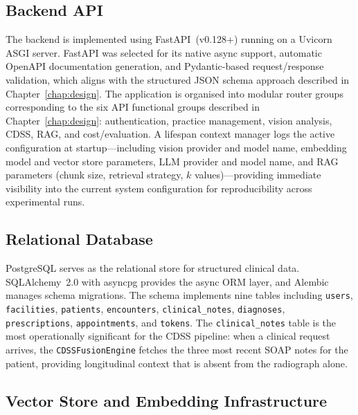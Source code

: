\documentclass[12pt,a4paper]{report}
\begin{document}
\subsection{Backend API}
\label{subsec:backend}

The backend is implemented using FastAPI~(v0.128+) running on a Uvicorn
ASGI server.  FastAPI was selected for its native async support,
automatic OpenAPI documentation generation, and Pydantic-based
request/response validation, which aligns with the structured JSON
schema approach described in Chapter~\ref{chap:design}.  The application is
organised into modular router groups corresponding to the six API
functional groups described in Chapter~\ref{chap:design}: authentication,
practice management, vision analysis, CDSS, RAG, and cost/evaluation.
A lifespan context manager logs the active configuration at startup---including
vision provider and model name, embedding model and vector store
parameters, LLM provider and model name, and RAG parameters (chunk
size, retrieval strategy, $k$ values)---providing immediate visibility
into the current system configuration for reproducibility across
experimental runs.

\subsection{Relational Database}
\label{subsec:db}

PostgreSQL serves as the relational store for structured clinical data.
SQLAlchemy~2.0 with asyncpg provides the async ORM layer, and Alembic
manages schema migrations.  The schema implements nine tables including
\texttt{users}, \texttt{facilities}, \texttt{patients},
\texttt{encounters}, \texttt{clinical\_notes}, \texttt{diagnoses},
\texttt{prescriptions}, \texttt{appointments}, and \texttt{tokens}.  The
\texttt{clinical\_notes} table is the most operationally significant for
the CDSS pipeline: when a clinical request arrives, the
\texttt{CDSSFusionEngine} fetches the three most recent SOAP notes for
the patient, providing longitudinal context that is absent from the
radiograph alone.

\subsection{Vector Store and Embedding Infrastructure}
\label{subsec:vector}
\end{document}
